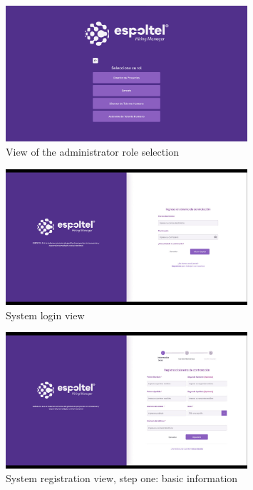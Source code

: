 \documentclass{scrreprt}
\begin{document}
\begin{figure}[H]
	\centering \small
	\includegraphics[width=0.8\textwidth]{WebPrototype/wflow-2.jpeg}
	\caption{View of the administrator role selection}
\end{figure}

\begin{figure}[H]
	\centering \small
	\includegraphics[width=0.8\textwidth]{WebPrototype/wflow-3.jpeg}
	\caption{System login view}
\end{figure}

\begin{figure}[H]
	\centering \small
	\includegraphics[width=0.8\textwidth]{WebPrototype/wflow-4.jpeg}
	\caption{System registration view, step one: basic information}
\end{figure}
\end{document}
